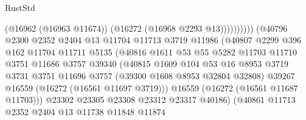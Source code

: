 \begin{lexlean}{RustStd}
\begin{coremodule}
                                              (@16962 (@16963 @11674))
                                              (@16272 (@16968 @2293 @13))))))))))
                              (@40796
                                @2300
                                @2352
                                @2404
                                @13
                                @11704
                                @11713
                                @3719
                                @11986
                                (@40807
                                  @2299
                                  @396
                                  @162
                                  @11704
                                  @11711
                                  @5135
                                  (@40816
                                    @1611
                                    @53
                                    @55
                                    @5282
                                    @11703
                                    @11710
                                    @3751
                                    @11686
                                    @3757
                                    @39340
                                    (@40815
                                      @1609
                                      @104
                                      @53
                                      @16
                                      @8953
                                      @3719
                                      @3731
                                      @3751
                                      @11696
                                      @3757
                                      (@39300 @1608 @8953 @32804 @32808)
                                      @39267
                                      @16559
                                      (@16272 (@16561 @11697 @3719)))
                                    @16559
                                    (@16272 (@16561 @11687 @11703)))
                                  @23302
                                  @23305
                                  @23308
                                  @23312
                                  @23317
                                  @40186)
                                (@40861
                                  @11713
                                  @2352
                                  @2404
                                  @13
                                  @11738
                                  @11848
                                  @11874

\end{coremodule}
\end{lexlean}
